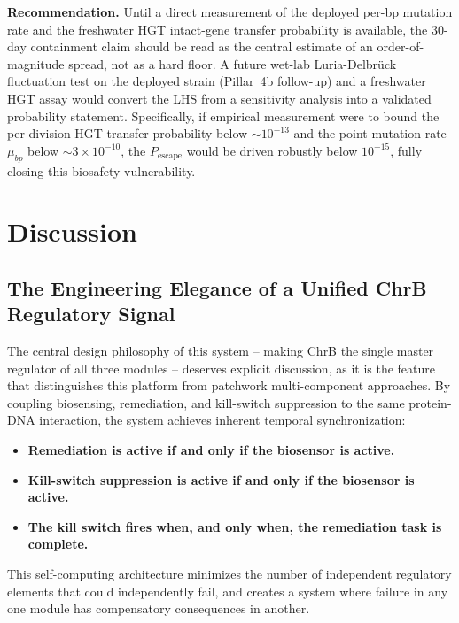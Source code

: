 \documentclass[10pt,twocolumn,letterpaper,
              colorlinks=true,
              linkcolor=blue!70!black,
              citecolor=blue!70!black,
              urlcolor=blue!70!black,
              pdfborder={0 0 0}]{article}
\begin{document}
\textbf{Recommendation.} Until a direct measurement of the deployed
per-bp mutation rate and the freshwater HGT intact-gene transfer
probability is available, the 30-day containment claim should be read
as the central estimate of an order-of-magnitude spread, not as a hard
floor.  A future wet-lab Luria-Delbr\"{u}ck fluctuation test on the
  deployed strain (Pillar~4b follow-up) and a freshwater HGT assay would
  convert the LHS from a sensitivity analysis into a validated probability
  statement. Specifically, if empirical measurement were to bound the per-division
  HGT transfer probability below $\sim 10^{-13}$ and the point-mutation rate
  $\mu_{bp}$ below $\sim 3 \times 10^{-10}$, the $P_{\text{escape}}$ would
  be driven robustly below $10^{-15}$, fully closing this biosafety vulnerability.

\section{Discussion}

\subsection{The Engineering Elegance of a Unified ChrB
            Regulatory Signal}

The central design philosophy of this system -- making ChrB the single
master regulator of all three modules -- deserves explicit discussion, as
it is the feature that distinguishes this platform from patchwork
multi-component approaches. By coupling biosensing, remediation, and
kill-switch suppression to the same protein-DNA interaction, the system
achieves inherent temporal synchronization:
\begin{itemize}
  \item \textbf{Remediation is active if and only if the biosensor
        is active.}
  \item \textbf{Kill-switch suppression is active if and only if
        the biosensor is active.}
  \item \textbf{The kill switch fires when, and only when, the
        remediation task is complete.}
\end{itemize}
This self-computing architecture minimizes the number of independent
regulatory elements that could independently fail, and creates a system
where failure in any one module has compensatory consequences in
another.
\end{document}
